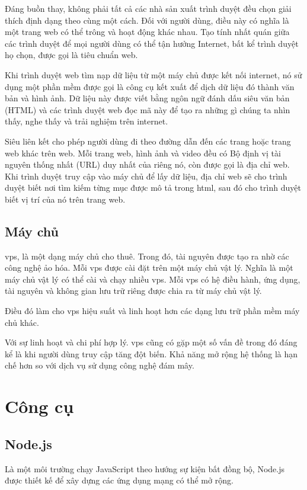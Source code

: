 \documentclass[11pt]{report}
\begin{document}
	Đáng buồn thay, không phải tất cả các nhà sản xuất trình duyệt đều chọn giải thích định dạng theo cùng một cách. Đối với người dùng, điều này có nghĩa là một trang web có thể trông và hoạt động khác nhau. Tạo tính nhất quán giữa các trình duyệt để mọi người dùng có thể tận hưởng Internet, bất kể trình duyệt họ chọn, được gọi là tiêu chuẩn web.
	
	Khi trình duyệt web tìm nạp dữ liệu từ một máy chủ được kết nối internet, nó sử dụng một phần mềm được gọi là công cụ kết xuất để dịch dữ liệu đó thành văn bản và hình ảnh. Dữ liệu này được viết bằng ngôn ngữ đánh dấu siêu văn bản (HTML) và các trình duyệt web đọc mã này để tạo ra những gì chúng ta nhìn thấy, nghe thấy và trải nghiệm trên internet.
	
	Siêu liên kết cho phép người dùng đi theo đường dẫn đến các trang hoặc trang web khác trên web. Mỗi trang web, hình ảnh và video đều có Bộ định vị tài nguyên thống nhất (URL) duy nhất của riêng nó, còn được gọi là địa chỉ web. Khi trình duyệt truy cập vào máy chủ để lấy dữ liệu, địa chỉ web sẽ cho trình duyệt biết nơi tìm kiếm từng mục được mô tả trong html, sau đó cho trình duyệt biết vị trí của nó trên trang web.
	
	\subsection{Máy chủ} \label{subsection:webserver}
	
	\acrshort{vps}, là một dạng máy chủ cho thuê. Trong đó, tài nguyên được tạo ra nhờ các công nghệ ảo hóa. Mỗi \acrshort{vps} được cài đặt trên một máy chủ vật lý. Nghĩa là một máy chủ vật lý có thể cài và chạy nhiều \acrshort{vps}. Mỗi \acrshort{vps} có hệ điều hành, ứng dụng, tài nguyên và không gian lưu trữ riêng được chia ra từ máy chủ vật lý.
	
	Điều đó làm cho \acrshort{vps} hiệu suất và linh hoạt hơn các dạng lưu trữ phần mềm máy chủ khác.
	
	Với sự linh hoạt và chi phí hợp lý. \acrshort{vps} cũng có gặp một số vấn đề trong đó đáng kể là khi người dùng truy cập tăng đột biến. Khả năng mở rộng hệ thống là hạn chế hơn so với dịch vụ sử dụng công nghệ đám mây. 
	
	\section{Công cụ}
	
	\subsection{Node.js}
	Là một môi trường chạy JavaScript theo hướng sự kiện bất đồng bộ, Node.js được thiết kế để xây dựng các ứng dụng mạng có thể mở rộng.
	
\end{document}
